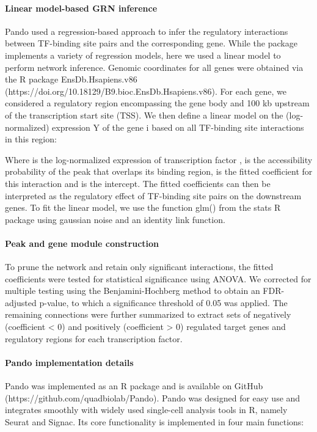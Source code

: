 \paragraph{Linear model-based GRN inference}
Pando used a regression-based approach to infer the regulatory interactions between TF-binding site pairs and the corresponding gene. While the package implements a variety of regression models, here we used a linear model to perform network inference. Genomic coordinates for all genes were obtained via the R package EnsDb.Hsapiens.v86 (https://doi.org/10.18129/B9.bioc.EnsDb.Hsapiens.v86).  For each gene, we considered a regulatory region encompassing the gene body and 100 kb upstream of the transcription start site (TSS). We then define a linear model on the (log-normalized) expression Y of the gene i based on all TF-binding site interactions in this region:

                                    
 
Where is the log-normalized expression of transcription factor , is the accessibility probability of the peak that overlaps its binding region, is the fitted coefficient for this interaction and  is the intercept. The fitted coefficients can then be interpreted as the regulatory effect of TF-binding site pairs on the downstream genes. To fit the linear model, we use the function glm() from the stats R package using gaussian noise and an identity link function.
 
 
\paragraph{Peak and gene module construction}
To prune the network and retain only significant interactions, the fitted coefficients were tested for statistical significance using ANOVA. We corrected for multiple testing using the Benjamini-Hochberg method to obtain an FDR-adjusted p-value, to which a significance threshold of 0.05 was applied. The remaining connections were further summarized to extract sets of negatively (coefficient < 0) and positively (coefficient > 0) regulated target genes and regulatory regions for each transcription factor.
 
 
\paragraph{Pando implementation details}
Pando was implemented as an R package and is available on GitHub (https://github.com/quadbiolab/Pando). Pando was designed for easy use and integrates smoothly with widely used single-cell analysis tools in R, namely Seurat and Signac. Its core functionality is implemented in four main functions:

